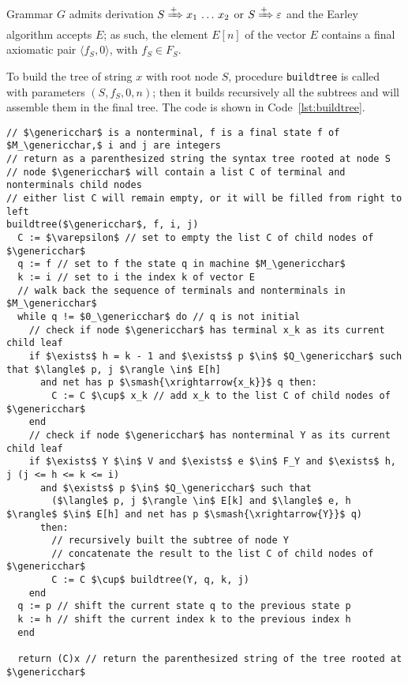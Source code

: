\documentclass[english]{article}
\begin{document}
Grammar \(G\) admits derivation \(S \xRightarrow{+} x_1 \,\ldots\, x_2\) or \(S \xRightarrow{+} \varepsilon\) and the Earley algorithm accepts \(E\);
as such, the element \(E[n]\) of the vector \(E\) contains a final axiomatic pair \(\langle f_S, 0 \rangle\), with \(f_S \in F_S\).

To build the tree of string \(x\) with root node \(S\), procedure \texttt{buildtree} is called with parameters \((S, f_S, 0, n)\);
then it builds recursively all the subtrees and will assemble them in the final tree.
The code is shown in Code~\ref{lst:buildtree}.

\begin{lstlisting}[caption={\texttt{buildtree} procedure}, label={lst:buildtree}]
// $\genericchar$ is a nonterminal, f is a final state f of $M_\genericchar,$ i and j are integers
// return as a parenthesized string the syntax tree rooted at node S
// node $\genericchar$ will contain a list C of terminal and nonterminals child nodes
// either list C will remain empty, or it will be filled from right to left
buildtree($\genericchar$, f, i, j)
  C := $\varepsilon$ // set to empty the list C of child nodes of $\genericchar$
  q := f // set to f the state q in machine $M_\genericchar$
  k := i // set to i the index k of vector E
  // walk back the sequence of terminals and nonterminals in $M_\genericchar$
  while q != $0_\genericchar$ do // q is not initial
    // check if node $\genericchar$ has terminal x_k as its current child leaf
    if $\exists$ h = k - 1 and $\exists$ p $\in$ $Q_\genericchar$ such that $\langle$ p, j $\rangle \in$ E[h]
      and net has p $\smash{\xrightarrow{x_k}}$ q then:
        C := C $\cup$ x_k // add x_k to the list C of child nodes of $\genericchar$
    end
    // check if node $\genericchar$ has nonterminal Y as its current child leaf
    if $\exists$ Y $\in$ V and $\exists$ e $\in$ F_Y and $\exists$ h, j (j <= h <= k <= i)
      and $\exists$ p $\in$ $Q_\genericchar$ such that
        ($\langle$ p, j $\rangle \in$ E[k] and $\langle$ e, h $\rangle$ $\in$ E[h] and net has p $\smash{\xrightarrow{Y}}$ q)
      then:
        // recursively built the subtree of node Y
        // concatenate the result to the list C of child nodes of $\genericchar$
        C := C $\cup$ buildtree(Y, q, k, j)
    end
  q := p // shift the current state q to the previous state p
  k := h // shift the current index k to the previous index h
  end

  return (C)x // return the parenthesized string of the tree rooted at $\genericchar$
\end{lstlisting}
\end{document}
